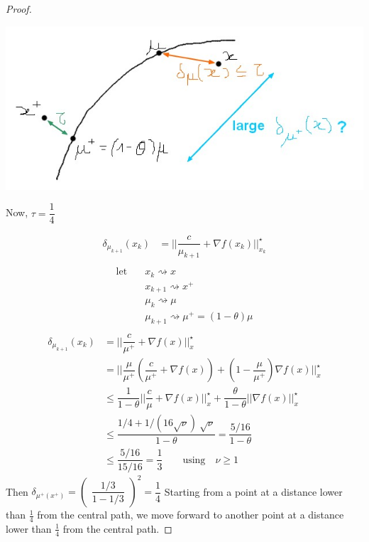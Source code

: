 \begin{proof}
\begin{center}
\includegraphics[scale=0.5]{images/12-fig3.jpg} 
\end{center}

Now, $\tau = \dfrac{1}{4}$

\begin{align*}\nonumber
\delta_{\mu_{k+1}}(x_k) &= || \dfrac{c}{\mu_{k+1}} + \nabla f(x_k) ||_{x_k}^{\star} \\ 
\end{align*}
\begin{align*}\nonumber
\text{let} &\quad x_k \rightsquigarrow x\\
&\quad x_{k+1} \rightsquigarrow x^+\\
&\quad \mu_k \rightsquigarrow \mu\\
&\quad \mu_{k+1} \rightsquigarrow \mu^+ = (1-\theta)\mu\\
\end{align*}
\begin{align*}\nonumber
\delta_{\mu_{k+1}}(x_k) &= || \dfrac{c}{\mu^+} + \nabla f(x) ||_x^{\star} \\
& \nonumber = || \dfrac{\mu}{\mu^{+}} (\dfrac{c}{\mu^+} + \nabla f(x)) + (1 - \dfrac{\mu}{\mu^+}) \nabla f(x) ||_x^{\star} \\
& \nonumber \leq \dfrac{1}{1 - \theta} || \dfrac{c}{\mu} + \nabla f(x) ||_x^{\star} + \dfrac{\theta}{1 - \theta} || \nabla f(x) ||_x^{\star} \\
& \nonumber \leq \dfrac{1/4 + 1/(16\sqrt{\nu})  ~ \sqrt{\nu}}{1 - \theta} = \dfrac{5/16}{1 - \theta} \\
& \nonumber \leq \dfrac{5/16}{15/16} = \dfrac{1}{3} \qquad \text{using} \quad \nu \geq 1
\end{align*}
Then $\delta_{\mu^+(x^+)} = \begin{pmatrix}
\dfrac{1/3}{1 - 1/3}
\end{pmatrix}^2 
= \dfrac{1}{4}$
Starting from a point at a distance lower than $\frac{1}{4}$ from the central path, we move forward to another point at a distance lower than $\frac{1}{4}$ from the central path.

\end{proof}

%